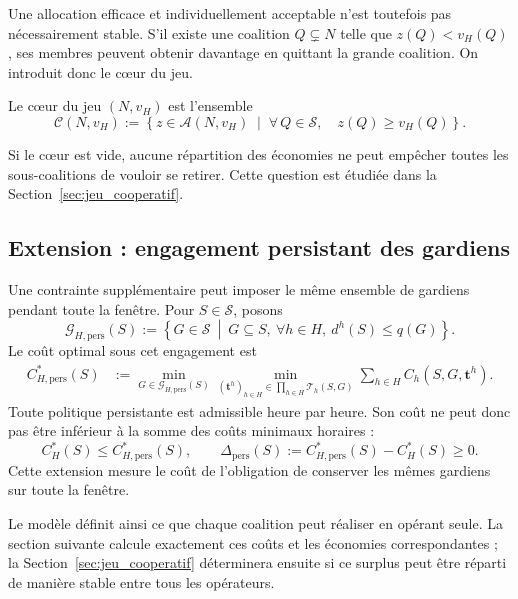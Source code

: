 Une allocation efficace et individuellement acceptable n'est toutefois pas
nécessairement stable. S'il existe une coalition \(Q\subsetneq N\) telle que
\(z(Q)<v_H(Q)\), ses membres peuvent obtenir davantage en quittant la grande
coalition. On introduit donc le cœur du jeu.

\begin{definition}
\label{def:coeur_v}
Le cœur du jeu $(N,v_H)$ est l'ensemble
\[
\mathcal C(N,v_H)
:=
\left\{
z\in\mathcal A(N,v_H)
\;\middle|\;
\forall\,Q\in\mathcal S,\quad
z(Q)\geqslant v_H(Q)
\right\}.
\]
\end{definition}

Si le cœur est vide, aucune répartition des économies ne peut empêcher toutes
les sous-coalitions de vouloir se retirer. Cette question est étudiée dans la
Section~\ref{sec:jeu_cooperatif}.


\subsection{Extension : engagement persistant des gardiens}
\label{subsec:extension_persistante}

Une contrainte supplémentaire peut imposer le même ensemble de gardiens
pendant toute la fenêtre. Pour \(S\in\mathcal S\), posons
\[
    \mathcal G_{H,\mathrm{pers}}(S)
    :=
    \left\{
        G\in\mathcal S
        \ \middle|\
        G\subseteq S,\ \forall h\in H,\ d^h(S)\leqslant q(G)
    \right\}.
\]
Le coût optimal sous cet engagement est
\begin{equation}
\begin{aligned}
    C_{H,\mathrm{pers}}^*(S)
    &:=
    \min_{G\in\mathcal G_{H,\mathrm{pers}}(S)}
    \min_{(\mathbf t^h)_{h\in H}
    \in\prod_{h\in H}\mathcal T_h(S,G)}
    \sum_{h\in H}C_h(S,G,\mathbf t^h).
    \label{eq:cout_persistant}
\end{aligned}
\end{equation}
Toute politique persistante est admissible heure par heure. Son coût ne peut
donc pas être inférieur à la somme des coûts minimaux horaires :
\begin{equation}
    C_H^*(S)\leqslant C_{H,\mathrm{pers}}^*(S),
    \qquad
    \Delta_{\mathrm{pers}}(S)
    :=
    C_{H,\mathrm{pers}}^*(S)-C_H^*(S)
    \geqslant0.
    \label{eq:cout_persistance}
\end{equation}
Cette extension mesure le coût de l'obligation de conserver les mêmes gardiens
sur toute la fenêtre.

Le modèle définit ainsi ce que chaque coalition peut réaliser en opérant
seule. La section suivante calcule exactement ces coûts et les économies
correspondantes ; la
Section~\ref{sec:jeu_cooperatif} déterminera ensuite si ce surplus peut être
réparti de manière stable entre tous les opérateurs.
